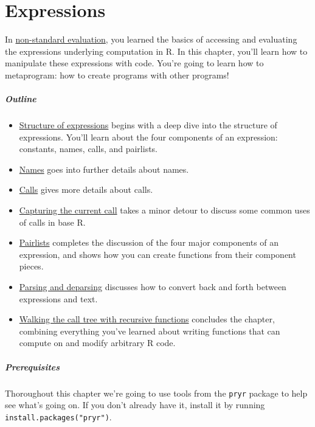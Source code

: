 \chapter{Expressions}\label{expressions}

In \hyperref[nse]{non-standard evaluation}, you learned the basics of
accessing and evaluating the expressions underlying computation in R. In
this chapter, you'll learn how to manipulate these expressions with
code. You're going to learn how to metaprogram: how to create programs
with other programs! 

\paragraph{Outline}

\begin{itemize}
\item
  \hyperref[structure-of-expressions]{Structure of expressions} begins
  with a deep dive into the structure of expressions. You'll learn about
  the four components of an expression: constants, names, calls, and
  pairlists.
\item
  \hyperref[names]{Names} goes into further details about names.
\item
  \hyperref[calls]{Calls} gives more details about calls.
\item
  \hyperref[capturing-call]{Capturing the current call} takes a minor
  detour to discuss some common uses of calls in base R.
\item
  \hyperref[pairlists]{Pairlists} completes the discussion of the four
  major components of an expression, and shows how you can create
  functions from their component pieces.
\item
  \hyperref[parsing-and-deparsing]{Parsing and deparsing} discusses how
  to convert back and forth between expressions and text.
\item
  \hyperref[ast-funs]{Walking the call tree with recursive functions}
  concludes the chapter, combining everything you've learned about
  writing functions that can compute on and modify arbitrary R code.
\end{itemize}

\paragraph{Prerequisites}

Thoroughout this chapter we're going to use tools from the \texttt{pryr}
package to help see what's going on. If you don't already have it,
install it by running \texttt{install.packages("pryr")}.

